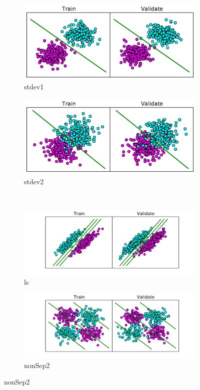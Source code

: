 \documentclass[10pt]{article}
\begin{document}
\begin{figure}[!ht]
\centering
\begin{subfigure}[b]{0.46\textwidth}
	\centering
	\includegraphics[width=.8\textwidth]{1-3-stdev1-1-0_15.pdf}
	\caption{stdev1}
	\label{fig:1-2-smalloverlap}
\end{subfigure}
\begin{subfigure}[b]{0.46\textwidth}
	\centering
	\includegraphics[width=.8\textwidth]{1-3-stdev2-10-0_15.pdf}
	\caption{stdev2}
	\label{fig:1-2-bigoverlap}
\end{subfigure}
\\
\begin{subfigure}[b]{0.46\textwidth}
	\centering
	\includegraphics[width=\textwidth]{1-2-ls.pdf}
	\caption{ls}
	\label{fig:1-2-ls}
\end{subfigure}
\begin{subfigure}[b]{0.46\textwidth}
	\centering
	\includegraphics[width=\textwidth]{1-2-nonSep2.pdf}
	\caption{nonSep2}
	\label{fig:1-2-nonSep2}
\end{subfigure}
\end{figure}
\end{document}
